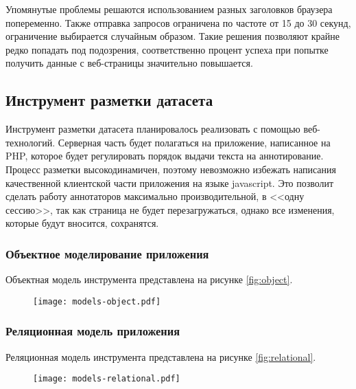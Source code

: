 \documentclass[../main]{subfiles}
\begin{document}
Упомянутые проблемы решаются использованием разных заголовков браузера попеременно. Также отправка запросов ограничена по частоте от 15 до 30 секунд, ограничение выбирается случайным образом. Такие решения позволяют крайне редко попадать под подозрения, соответственно процент успеха при попытке получить данные с веб-страницы значительно повышается.

\subsection{Инструмент разметки датасета}
Инструмент разметки датасета планировалось реализовать с помощью веб-технологий. Серверная часть будет полагаться на приложение, написанное на PHP, которое будет регулировать порядок выдачи текста на аннотирование. Процесс разметки высокодинамичен, поэтому невозможно избежать написания качественной клиентской части приложения на языке javascript. Это позволит сделать работу аннотаторов максимально производительной, в <<одну сессию>>, так как страница не будет перезагружаться, однако все изменения, которые будут вносится, сохранятся.

\subsubsection{Объектное моделирование приложения}

Объектная модель инструмента представлена на рисунке \ref{fig:object}.

\begin{figure}[H]
    \centering
    {\texttt{[image: models-object.pdf]}}
    \vspace{-\baselineskip}
\end{figure}

\subsubsection{Реляционная модель приложения}

Реляционная модель инструмента представлена на рисунке \ref{fig:relational}.

\begin{figure}[H]
    \centering
    {\texttt{[image: models-relational.pdf]}}
    \vspace{-\baselineskip}
\end{figure}
\end{document}
